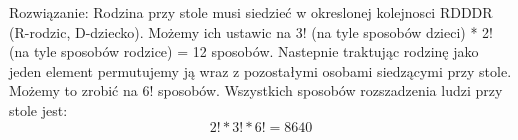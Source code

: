 \medskip
{} 
\medskip

Rozwiązanie:
Rodzina przy stole musi siedzieć w okreslonej kolejnosci RDDDR (R-rodzic, D-dziecko). Możemy ich ustawic na 3! (na tyle sposobów dzieci) * 2! (na tyle sposobów rodzice)  = 12 sposobów. 
Nastepnie traktując rodzinę jako jeden element permutujemy ją wraz z pozostałymi osobami siedzącymi przy stole. Możemy to zrobić na 6! sposobów. Wszystkich
sposobów rozszadzenia ludzi przy stole jest:
$$
2! * 3! * 6! = 8 640
$$
